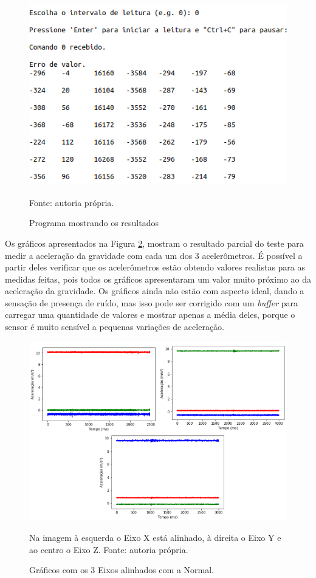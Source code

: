 	\begin{figure}[h]
		\centering
		\includegraphics[keepaspectratio=true,scale=0.5]{figuras/programa_rodando.png}
		\caption{Programa mostrando os resultados}
		Fonte: autoria própria. 
		\label{rodando}	
	\end{figure}
	
		
	Os gráficos apresentados na Figura \ref{acelx_0}, mostram o resultado parcial do teste para medir a aceleração da gravidade com cada um dos 3 acelerômetros. É possível a partir deles verificar que os acelerômetros estão obtendo valores realistas para as medidas feitas, pois todos os gráficos apresentaram um valor muito próximo ao da aceleração da gravidade. Os gráficos ainda não estão com aspecto ideal, dando a sensação de presença de ruído, mas isso pode ser corrigido com um \textit{buffer} para carregar uma quantidade de valores e mostrar apenas a média deles, porque o sensor é muito sensível a pequenas variações de aceleração.   
	
	\begin{figure}[h]
		\centering
		\includegraphics[keepaspectratio=true,scale=0.5]{figuras/graficos_acel.png}
		\caption{Gráficos com os 3 Eixos alinhados com a Normal.}
		Na imagem à esquerda o Eixo X está alinhado, à direita o Eixo Y e ao centro o Eixo Z. \footnotesize
		Fonte: autoria própria. 
		\label{acelx_0}	
	\end{figure}		
	
